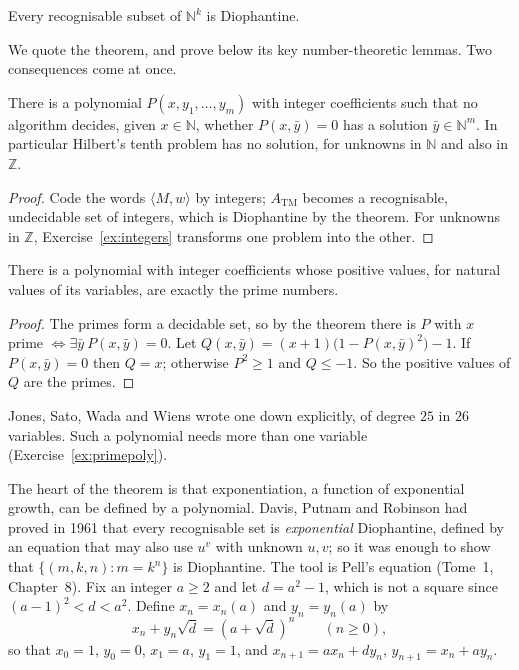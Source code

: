 \begin{theorem}\label{thm:mrdp}
Every recognisable subset of $\mathbb N^k$ is Diophantine.
\end{theorem}

We quote the theorem, and prove below its key number-theoretic lemmas. Two consequences come at once.

\begin{corollary}\label{cor:hilbert10}
There is a polynomial $P(x,y_1,\dots,y_m)$ with integer coefficients such that no algorithm decides, given $x\in\mathbb N$, whether $P(x,\bar y)=0$ has a solution $\bar y\in\mathbb N^m$. In particular Hilbert's tenth problem has no solution, for unknowns in $\mathbb N$ and also in $\mathbb Z$.
\end{corollary}

\begin{proof}
Code the words $\langle M,w\rangle$ by integers; $A_{\mathrm{TM}}$ becomes a recognisable, undecidable set of integers, which is Diophantine by the theorem. For unknowns in $\mathbb Z$, Exercise~\ref{ex:integers} transforms one problem into the other.
\end{proof}

\begin{corollary}\label{cor:primepoly}
There is a polynomial with integer coefficients whose positive values, for natural values of its variables, are exactly the prime numbers.
\end{corollary}

\begin{proof}
The primes form a decidable set, so by the theorem there is $P$ with $x$ prime $\iff\exists\bar y\ P(x,\bar y)=0$. Let $Q(x,\bar y)=(x+1)\bigl(1-P(x,\bar y)^2\bigr)-1$. If $P(x,\bar y)=0$ then $Q=x$; otherwise $P^2\ge1$ and $Q\le-1$. So the positive values of $Q$ are the primes.
\end{proof}

Jones, Sato, Wada and Wiens wrote one down explicitly, of degree $25$ in $26$ variables. Such a polynomial needs more than one variable (Exercise~\ref{ex:primepoly}).

The heart of the theorem is that exponentiation, a function of exponential growth, can be defined by a polynomial. Davis, Putnam and Robinson had proved in 1961 that every recognisable set is \emph{exponential} Diophantine, defined by an equation that may also use $u^v$ with unknown $u,v$; so it was enough to show that $\{(m,k,n):m=k^n\}$ is Diophantine. The tool is Pell's equation (Tome~1, Chapter~8). Fix an integer $a\ge2$ and let $d=a^2-1$, which is not a square since $(a-1)^2<d<a^2$. Define $x_n=x_n(a)$ and $y_n=y_n(a)$ by
\[
x_n+y_n\sqrt d=(a+\sqrt d)^n\qquad(n\ge0),
\]
so that $x_0=1$, $y_0=0$, $x_1=a$, $y_1=1$, and $x_{n+1}=ax_n+dy_n$, $y_{n+1}=x_n+ay_n$.

